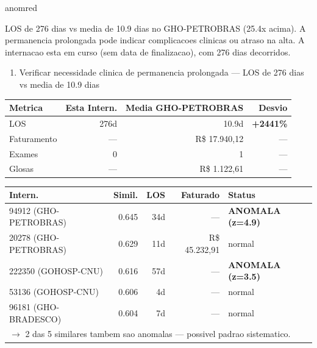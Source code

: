 \documentclass[a4paper,10pt]{article}
\begin{document}
\begin{anomalycard}[Internacao 136915 | GHO-PETROBRAS | CRITICO (z=5.03)]{anomred}
\vspace{2pt}\begin{tcolorbox}[colback=severityred!20,colframe=anomred,title={\textbf{Interpretacao de Negocio}},fonttitle=\bfseries\small,left=4pt,right=4pt,top=3pt,bottom=3pt]
{\small LOS de 276 dias vs media de 10.9 dias no GHO-PETROBRAS (25.4x acima). A permanencia prolongada pode indicar complicacoes clinicas ou atraso na alta. A internacao esta em curso (sem data de finalizacao), com 276 dias decorridos.}
\end{tcolorbox}
\begin{tcolorbox}[colback=severityyellow!30,colframe=anomorange,title={\textbf{Recomendacoes Especificas}},fonttitle=\bfseries\small,left=4pt,right=4pt,top=3pt,bottom=3pt]
\begin{enumerate}[nosep,leftmargin=16pt]
\item {\small Verificar necessidade clinica de permanencia prolongada --- LOS de 276 dias vs media de 10.9 dias}
\end{enumerate}
\end{tcolorbox}
\begin{center}\begin{tabular}{l r r r}\toprule\textbf{Metrica} & \textbf{Esta Intern.} & \textbf{Media GHO-PETROBRAS} & \textbf{Desvio} \\\midrule
LOS & 276d & 10.9d & \textcolor{anomred}{\textbf{+2441\%}} \\
Faturamento & --- & R\$ 17.940,12 & --- \\
Exames & 0 & 1 & --- \\
Glosas & --- & R\$ 1.122,61 & --- \\
\bottomrule\end{tabular}\end{center}

\begin{tabular}{l r r r l}\toprule\textbf{Intern.} & \textbf{Simil.} & \textbf{LOS} & \textbf{Faturado} & \textbf{Status} \\\midrule
94912 (GHO-PETROBRAS) & 0.645 & 34d & --- & \textcolor{anomred}{\textbf{ANOMALA (z=4.9)}} \\
20278 (GHO-PETROBRAS) & 0.629 & 11d & R\$ 45.232,91 & \textcolor{jcubeblue}{normal} \\
222350 (GOHOSP-CNU) & 0.616 & 57d & --- & \textcolor{anomred}{\textbf{ANOMALA (z=3.5)}} \\
53136 (GOHOSP-CNU) & 0.606 & 4d & --- & \textcolor{jcubeblue}{normal} \\
96181 (GHO-BRADESCO) & 0.604 & 7d & --- & \textcolor{jcubeblue}{normal} \\
\multicolumn{5}{l}{\textcolor{anomred}{\small $\rightarrow$ 2 das 5 similares tambem sao anomalas --- possivel padrao sistematico.}} \\
\bottomrule\end{tabular}


\end{anomalycard}
\end{document}
